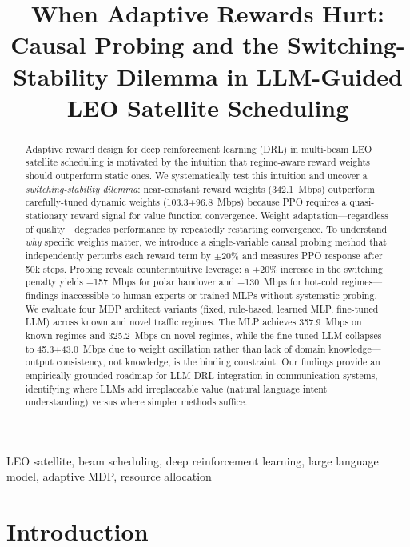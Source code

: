\documentclass[conference]{IEEEtran}
\begin{document}
\title{When Adaptive Rewards Hurt: Causal Probing and the Switching-Stability Dilemma in LLM-Guided LEO Satellite Scheduling}

\author{}

\maketitle

\begin{abstract}
Adaptive reward design for deep reinforcement learning (DRL) in multi-beam LEO satellite scheduling is motivated by the intuition that regime-aware reward weights should outperform static ones. We systematically test this intuition and uncover a \emph{switching-stability dilemma}: near-constant reward weights (342.1~Mbps) outperform carefully-tuned dynamic weights (103.3$\pm$96.8~Mbps) because PPO requires a quasi-stationary reward signal for value function convergence. Weight adaptation---regardless of quality---degrades performance by repeatedly restarting convergence. To understand \emph{why} specific weights matter, we introduce a single-variable causal probing method that independently perturbs each reward term by $\pm$20\% and measures PPO response after 50k steps. Probing reveals counterintuitive leverage: a $+$20\% increase in the switching penalty yields $+$157~Mbps for polar handover and $+$130~Mbps for hot-cold regimes---findings inaccessible to human experts or trained MLPs without systematic probing. We evaluate four MDP architect variants (fixed, rule-based, learned MLP, fine-tuned LLM) across known and novel traffic regimes. The MLP achieves 357.9~Mbps on known regimes and 325.2~Mbps on novel regimes, while the fine-tuned LLM collapses to 45.3$\pm$43.0~Mbps due to weight oscillation rather than lack of domain knowledge---output consistency, not knowledge, is the binding constraint. Our findings provide an empirically-grounded roadmap for LLM-DRL integration in communication systems, identifying where LLMs add irreplaceable value (natural language intent understanding) versus where simpler methods suffice.
\end{abstract}

\begin{IEEEkeywords}
LEO satellite, beam scheduling, deep reinforcement learning, large language model, adaptive MDP, resource allocation
\end{IEEEkeywords}

\section{Introduction}
\end{document}
